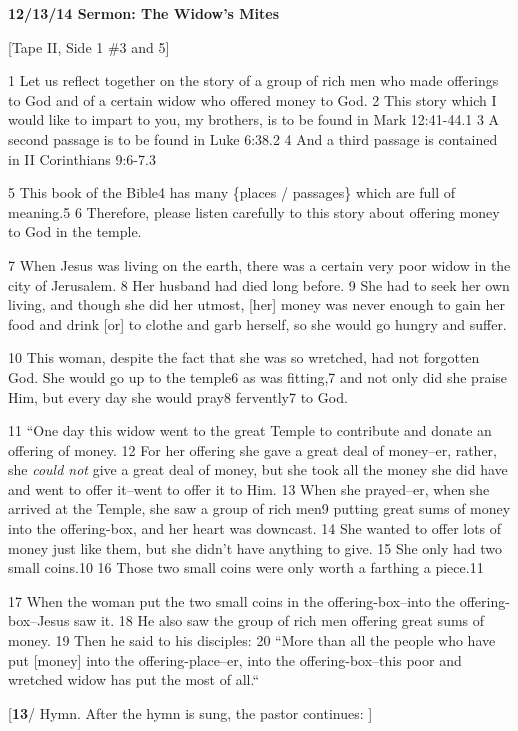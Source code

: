 
\textbf{12/13/14 Sermon: The Widow's Mites}

[Tape II, Side 1 \#3 and 5]

1 Let us reflect together on the story of a group of rich men who made offerings
to God and of a certain widow who offered money to God. 2 This story which I would
like to impart to you, my brothers, is to be found in Mark 12:41-44.1 3 A second
passage is to be found in Luke 6:38.2 4 And a third passage is contained in II
Corinthians 9:6-7.3

5 This book of the Bible4 has many \{places / passages\} which are full of meaning.5
6 Therefore, please listen carefully to this story about offering money to God
in the temple.

7 When Jesus was living on the earth, there was a certain very poor widow in the
city of Jerusalem. 8 Her husband had died long before. 9 She had to seek her own
living, and though she did her utmost, [her] money was never enough to gain her
food and drink [or] to clothe and garb herself, so she would go hungry and suffer.

10 This woman, despite the fact that she was so wretched, had not forgotten God.
She would go up to the temple6 as was fitting,7 and not only did she praise Him,
but every day she would pray8 fervently7 to God.

11 ``One day this widow went to the great Temple to contribute and donate
an offering of money. 12 For her offering she gave a great deal of money--er, rather,
she \textit{could not} give a great deal of money, but she took all the money she
did have and went to offer it--went to offer it to Him. 13 When she prayed--er,
when she arrived at the Temple, she saw a group of rich men9 putting great sums
of money into the offering-box, and her heart was downcast. 14 She wanted to offer
lots of money just like them, but she didn't have anything to give. 15 She only
had two small coins.10 16 Those two small coins were only worth a farthing a piece.11

17 When the woman put the two small coins in the offering-box--into the offering-box--Jesus
saw it. 18 He also saw the group of rich men offering great sums of money. 19 Then
he said to his disciples: 20 ``More than all the people who have put [money]
into the offering-place--er, into the offering-box--this poor and wretched widow
has put the most of all.``

[\textbf{13}/ Hymn. After the hymn is sung, the pastor continues: ]

